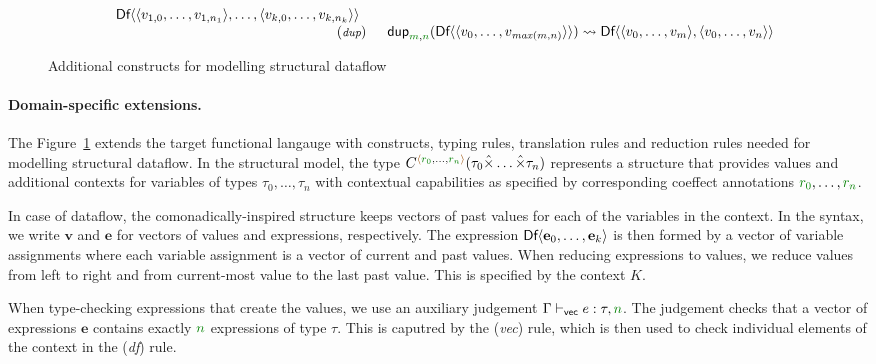 \begin{figure}[t]
\begin{equation*}
\begin{array}{rl}
\begin{array}{l}
\\[-0.25em]
\quad \ident{Df}\langle\langle v_{1,0}, \ldots, v_{1, n_1} \rangle,\ldots,\langle v_{k,0}, \ldots, v_{k, n_k} \rangle\rangle
\end{array}
\\[0.25em]
{\footnotesize(\emph{dup})} & \begin{array}{l}
\ident{dup}_{\cclrd{m},\cclrd{n}} (\ident{Df}\langle\langle v_0, \ldots, v_{\mathit{max}(m,n)} \rangle\rangle) \rightsquigarrow
  \ident{Df}\langle\langle v_0, \ldots, v_m \rangle, \langle v_0, \ldots, v_n \rangle\rangle
\end{array}
\end{array}
\end{equation*}

\caption{Additional constructs for modelling structural dataflow}
\label{fig:structural-ext-df}
\end{figure}


\paragraph{Domain-specific extensions.}

The Figure~\ref{fig:structural-ext-df} extends the target functional langauge with constructs,
typing rules, translation rules and reduction rules needed for modelling structural dataflow.
In the structural model, the type $\ctyp{\alift{\cclrd{r_0}, \ldots, \cclrd{r_n}}}{(\tau_0\xtimes\ldots\xtimes\tau_n)}$
represents a structure that provides values and additional contexts for variables of types
$\tau_0,\ldots,\tau_n$ with contextual capabilities as specified by corresponding coeffect annotations
$\cclrd{r_0}, \ldots, \cclrd{r_n}$.

In case of dataflow, the comonadically-inspired structure keeps vectors of past values for each of
the variables in the context. In the syntax, we write $\textbf{v}$ and $\textbf{e}$ for vectors of
values and expressions, respectively. The expression $\textnormal{\sffamily Df}\langle \textbf{e}_0, \ldots, \textbf{e}_k \rangle$
is then formed by a vector of variable assignments where each variable assignment is a vector
of current and past values. When reducing expressions to values, we reduce values from left to
right and from current-most value to the last past value. This is specified by the context $K$.

When type-checking expressions that create the  values, we use an auxiliary judgement
$\Gamma \vdash_{\ident{vec}} e : \tau, \cclrd{n}$. The judgement checks that a vector of expressions
$\textbf{e}$ contains exactly $\cclrd{n}$ expressions of type $\tau$. This is caputred by the
(\emph{vec}) rule, which is then used to check individual elements of the context in the
(\emph{df}) rule.

